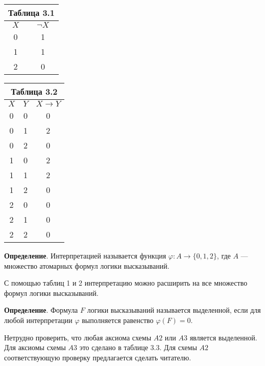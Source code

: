 \documentclass[a4paper]{article}
\begin{document}
\begin{minipage}{0.5\textwidth}
	\begin{flushleft}
		\begin{tabular}{| c | c |}
			\multicolumn{2}{c}{Таблица 3.1} \\
			\hline
			$X$ & $\neg X$ \\
			\hline
			0 & 1\\
			\hline
			1 & 1\\
			\hline
			2 & 0\\
			\hline
		\end{tabular}
	\end{flushleft}
\end{minipage}
\begin{minipage}{0.5\textwidth}
	\begin{flushright}
		\begin{tabular}{| c | c | c |}
			\multicolumn{3}{c}{Таблица 3.2}\\
			\hline
			$X$ & $Y$ & $X \rightarrow Y$\\
			\hline
			0 & 0 & 0\\
			\hline
			0 & 1 & 2\\
			\hline
			0 & 2 & 0\\
			\hline
			1 & 0 & 2\\
			\hline
			1 & 1 & 2\\
			\hline
			1 & 2 & 0\\
			\hline
			2 & 0 & 0\\
			\hline
			2 & 1 & 0\\
			\hline
			2 & 2 & 0\\
			\hline
		\end{tabular}
	\end{flushright}
\end{minipage}

\textbf{Определение}. Интерпретацией называется функция $\varphi: A \rightarrow \{0, 1, 2\}$, где $A$ --- множество атомарных формул логики высказываний. 

С помощью таблиц 1 и 2 интерпретацию можно расширить на все множество формул логики высказываний.

\textbf{Определение}. Формула $F$ логики высказываний называется выделенной, если для любой интерпретации $\varphi$ выполняется равенство $\varphi(F) = 0$.

Нетрудно проверить, что любая аксиома схемы $A2$ или $A3$ является выделенной. Для аксиомы схемы $A3$ это сделано в таблице 3.3. Для схемы $A2$ соответствующую проверку предлагается сделать читателю.
\end{document}
